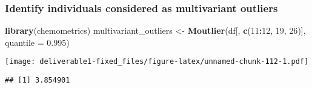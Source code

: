 \documentclass[
  18pt,
  a4paper]{article}
\newenvironment{Shaded}{\begin{snugshade}}{\end{snugshade}}
\newcommand{\DataTypeTok}[1]{\textcolor[rgb]{0.13,0.29,0.53}{#1}}
\newcommand{\DecValTok}[1]{\textcolor[rgb]{0.00,0.00,0.81}{#1}}
\newcommand{\FloatTok}[1]{\textcolor[rgb]{0.00,0.00,0.81}{#1}}
\newcommand{\KeywordTok}[1]{\textcolor[rgb]{0.13,0.29,0.53}{\textbf{#1}}}
\newcommand{\NormalTok}[1]{#1}
\newcommand{\OperatorTok}[1]{\textcolor[rgb]{0.81,0.36,0.00}{\textbf{#1}}}
\newcommand{\StringTok}[1]{\textcolor[rgb]{0.31,0.60,0.02}{#1}}
\begin{document}
\hypertarget{identify-individuals-considered-as-multivariant-outliers}{%
\subsubsection{Identify individuals considered as multivariant
outliers}\label{identify-individuals-considered-as-multivariant-outliers}}

\begin{Shaded}
\begin{Highlighting}[]
\KeywordTok{library}\NormalTok{(chemometrics)}
\NormalTok{multivariant_outliers <-}\StringTok{ }\KeywordTok{Moutlier}\NormalTok{(df[, }\KeywordTok{c}\NormalTok{(}\DecValTok{11}\OperatorTok{:}\DecValTok{12}\NormalTok{, }\DecValTok{19}\NormalTok{, }\DecValTok{26}\NormalTok{)], }\DataTypeTok{quantile =} \FloatTok{0.995}\NormalTok{)}
\end{Highlighting}
\end{Shaded}

\texttt{[image: deliverable1-fixed\_files/figure-latex/unnamed-chunk-112-1.pdf]}

\begin{Shaded}
\end{Shaded}

\begin{verbatim}
## [1] 3.854901
\end{verbatim}

\begin{Shaded}
\end{Shaded}
\end{document}
